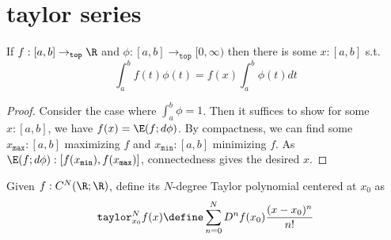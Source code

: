 \documentclass[10pt]{scrartcl}
\newcommand{\cattop}{\mathtt{top}}
\begin{document}
\section{taylor series}
\newcommand{\taylor}{\mathtt{taylor}}
\begin{lemma}
  \label{mvt-int}
  If $f:[a,b]\to_\cattop\R$ and $\phi:[a,b]\to_\cattop[0,\infty)$ then there is some $x:[a,b]$ s.t.
  \[
  \int_a^bf(t)\phi(t)=f(x)\int_a^b\phi(t)dt
  \]
  \cite{wiki:mvt-int}
\end{lemma}
\begin{proof}
  Consider the case where $\int_a^b\phi=1$. Then it suffices to show for some $x:[a,b]$, we have $f(x)=\E(f;d\phi)$. By compactness, we can find some 
  \newcommand{\xmax}{x_{\mathtt{max}}}
  \newcommand{\xmin}{x_{\mathtt{min}}}
  $\xmax:[a,b]$ maximizing $f$ and $\xmin:[a,b]$ minimizing $f$. As $\E(f;d\phi):[f(\xmin),f(\xmax)]$, connectedness gives the desired $x$. 
\end{proof}

\begin{defn}
  Given $f:C^N(\R;\R)$, define its $N$-degree Taylor polynomial centered at $x_0$ as
  \[
  \taylor_{x_0}^Nf(x)\define\sum_{n=0}^N D^nf(x_0) \frac{(x-x_0)^n}{n!}
  \]
\end{defn}

  
\end{document}
